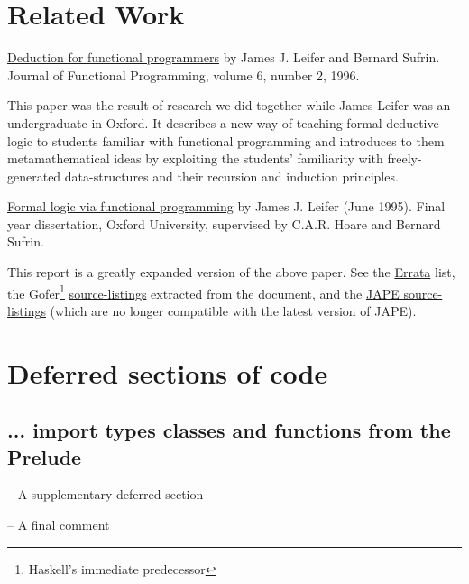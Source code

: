 \documentclass[11pt]{article}
\begin{document}
\section{Related Work}

\href{http://pauillac.inria.fr/~leifer/articles/logic/LogicPearl.dvi.gz}
{Deduction for functional programmers} by James J. Leifer and Bernard Sufrin.
Journal of Functional Programming, volume 6, number 2, 1996.

This paper was the result of research we did together while James Leifer was an undergraduate 
in Oxford. It describes a new way of
teaching formal deductive logic to students familiar with functional
programming and introduces to them metamathematical ideas by
exploiting the students' familiarity with freely-generated
data-structures and their recursion and induction principles.

\href{http://pauillac.inria.fr/~leifer/articles/logic/LogicviaFP.300.ps.gz}
{Formal logic via functional programming} by James J. Leifer (June 1995).
Final year dissertation, Oxford University, supervised by
C.A.R. Hoare and Bernard Sufrin.

This report is a greatly expanded version of the above paper. See
the
\href{http://pauillac.inria.fr/~leifer/articles/logic/LogicviaFP.Errata}
{Errata} list, the Gofer\footnote{Haskell's immediate predecessor}
\href{http://pauillac.inria.fr/~leifer/articles/logic/LogicviaFP.gs}
{source-listings} extracted from the document, and the
\href{http://pauillac.inria.fr/~leifer/articles/logic/LogicviaFP.j} {JAPE
source-listings} (which are no longer compatible with the
latest version of JAPE).

\appendix
\section{Deferred sections of code}

\subsection{... import types classes and functions from the Prelude}

\begin{code}[]
 -- A supplementary deferred section
 
\end{code}

\begin{code}[propositions.hs]
 -- A final comment
 
\end{code}
\end{document}
